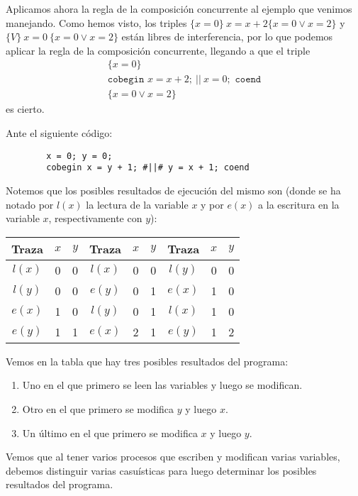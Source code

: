 \begin{ejemplo}
    Aplicamos ahora la regla de la composición concurrente al ejemplo que venimos manejando. Como hemos visto, los triples $\{x=0\}\ x=x+2\{x=0 \lor x=2\}$ y $\{V\}\ x=0\ \{x=0 \lor x=2\}$ están libres de interferencia, por lo que podemos aplicar la regla de la composición concurrente, llegando a que el triple
    \begin{gather*}
        \{x=0\} \\
        \texttt{cobegin } x=x+2;\ ||\ x=0; \texttt{ coend} \\
        \{x=0 \lor x=2\}
    \end{gather*}
    es cierto.
\end{ejemplo}

\begin{ejemplo}
    Ante el siguiente código:
    \begin{verbatim}
        x = 0; y = 0;
        cobegin x = y + 1; #||# y = x + 1; coend
    \end{verbatim}
    Notemos que los posibles resultados de ejecución del mismo son (donde se ha notado por $l(x)$ la lectura de la variable $x$ y por $e(x)$ a la escritura en la variable $x$, respectivamente con $y$):
    \begin{table}[H]
    \centering
    \begin{tabular}{|c|c|c||c|c|c||c|c|c|}
        \hline
        Traza & $x$ & $y$ &Traza & $x$ & $y$ &Traza & $x$ & $y$ \\
        \hline
        $l(x)$ & 0 & 0 & $l(x)$ & 0 & 0 & $l(y)$ & 0 & 0      \\
        \hline                                                        
        $l(y)$ & 0 & 0 & $e(y)$ & 0 & 1 & $e(x)$ & 1 & 0  \\
        \hline                                                            
        $e(x)$ & 1 & 0 & $l(y)$ & 0 & 1 & $l(x)$ & 1 & 0      \\
        \hline                                                            
        $e(y)$ & 1 & 1 & $e(x)$ & 2 & 1 & $e(y)$ & 1 & 2  \\
        \hline
    \end{tabular}
    \end{table}
    Vemos en la tabla que hay tres posibles resultados del programa:
    \begin{enumerate}
        \item Uno en el que primero se leen las variables y luego se modifican.
        \item Otro en el que primero se modifica $y$ y luego $x$.
        \item Un último en el que primero se modifica $x$ y luego $y$.
    \end{enumerate}
    Vemos que al tener varios procesos que escriben y modifican varias variables, debemos distinguir varias casuísticas para luego determinar los posibles resultados del programa.\\


\end{ejemplo}
